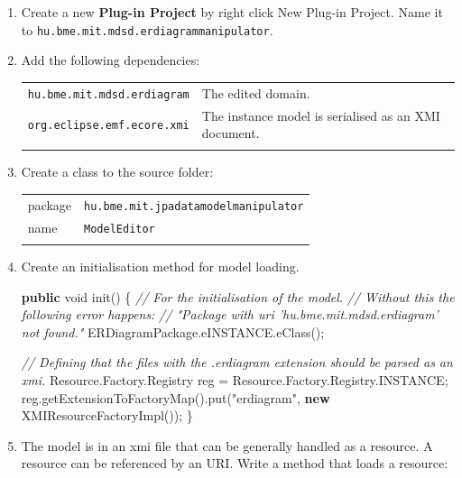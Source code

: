 \documentclass[]{report}
\newenvironment{Shaded}{}{}
\newcommand{\KeywordTok}[1]{\textcolor[rgb]{0.00,0.44,0.13}{\textbf{{#1}}}}
\newcommand{\DataTypeTok}[1]{\textcolor[rgb]{0.56,0.13,0.00}{{#1}}}
\newcommand{\StringTok}[1]{\textcolor[rgb]{0.25,0.44,0.63}{{#1}}}
\newcommand{\CommentTok}[1]{\textcolor[rgb]{0.38,0.63,0.69}{\textit{{#1}}}}
\newcommand{\FunctionTok}[1]{\textcolor[rgb]{0.02,0.16,0.49}{{#1}}}
\newcommand{\NormalTok}[1]{{#1}}
\begin{document}
\begin{enumerate}
\def\labelenumi{\arabic{enumi}.}
\item
  Create a new \textbf{Plug-in Project} by right click \textbar{} New
  \textbar{} Plug-in Project. Name it to
  \texttt{hu.bme.mit.mdsd.erdiagrammanipulator}.
\item
  Add the following dependencies:

  \begin{longtable}[c]{@{}ll@{}}
  \hline\noalign{\medskip}
  \texttt{hu.bme.mit.mdsd.erdiagram} & The edited domain.
  \\\noalign{\medskip}
  \texttt{org.eclipse.emf.ecore.xmi} & The instance model is serialised
  as an XMI document.
  \\\noalign{\medskip}
  \hline
  \end{longtable}
\item
  Create a class to the source folder:

  \begin{longtable}[c]{@{}ll@{}}
  \hline\noalign{\medskip}
  package & \texttt{hu.bme.mit.jpadatamodelmanipulator}
  \\\noalign{\medskip}
  name & \texttt{ModelEditor}
  \\\noalign{\medskip}
  \hline
  \end{longtable}
\item
  Create an initialisation method for model loading.

\begin{Shaded}
\begin{Highlighting}[]
\KeywordTok{public} \DataTypeTok{void} \FunctionTok{init}\NormalTok{() \{}
   \CommentTok{// For the initialisation of the model.}
   \CommentTok{// Without this the following error happens:}
   \CommentTok{//  "Package with uri 'hu.bme.mit.mdsd.erdiagram' not found."}
   \NormalTok{ERDiagramPackage.}\FunctionTok{eINSTANCE}\NormalTok{.}\FunctionTok{eClass}\NormalTok{();}

   \CommentTok{// Defining that the files with the .erdiagram extension should be parsed as an xmi.}
   \NormalTok{Resource.}\FunctionTok{Factory}\NormalTok{.}\FunctionTok{Registry} \NormalTok{reg = Resource.}\FunctionTok{Factory}\NormalTok{.}\FunctionTok{Registry}\NormalTok{.}\FunctionTok{INSTANCE}\NormalTok{;}
   \NormalTok{reg.}\FunctionTok{getExtensionToFactoryMap}\NormalTok{().}\FunctionTok{put}\NormalTok{(}\StringTok{"erdiagram"}\NormalTok{, }\KeywordTok{new} \FunctionTok{XMIResourceFactoryImpl}\NormalTok{());}
\NormalTok{\}}
\end{Highlighting}
\end{Shaded}
\item
  The model is in an xmi file that can be generally handled as a
  resource. A resource can be referenced by an URI. Write a method that
  loads a resource:


\end{enumerate}
\end{document}
